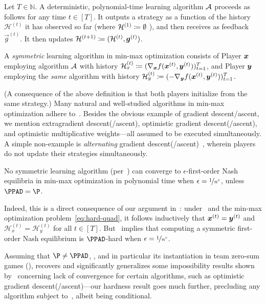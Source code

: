 \begin{definition}
    \label{def:sym-dynamics}
    Let $T \in \mathbb{N}$. A deterministic, polynomial-time learning algorithm $\mathcal{A}$ proceeds as follows for any time $t \in [T]$. It outputs a strategy as a function of the history $\mathcal{H}^{(t)}$ it has observed so far (where $\mathcal{H}^{(1)} \coloneqq \emptyset$ ), and then receives as feedback $\vec{g}^{(t)}$. It then updates $\mathcal{H}^{(t+1)} \coloneqq ( \mathcal{H}^{(t)}, \bm{g}^{(t)})$. 
    
    A \emph{symmetric} learning algorithm in min-max optimization consists of Player ${\bm{x}}$ employing algorithm $\mathcal{A}$ with history $\mathcal{H}_x^{(t)} \coloneqq (\nabla_{{\bm{x}}} f({\bm{x}}^{(t)}, {\bm{y}}^{(t)}) )_{t=1}^T$, and Player ${\bm{y}}$ employing the \emph{same} algorithm with history $\mathcal{H}_y^{(t)} \coloneqq (- \nabla_{{\bm{y}}} f({\bm{x}}^{(t)}, {\bm{y}}^{(t)}) )_{t=1}^T$.
\end{definition}

(A consequence of the above definition is that both players initialize from the same strategy.) Many natural and well-studied algorithms in min-max optimization adhere to~. Besides the obvious example of gradient descent/ascent, we mention extragradient descent(/ascent), optimistic gradient descent(/ascent), and optimistic multiplicative weights---all assumed to be executed simultaneously. A simple non-example is \emph{alternating} gradient descent(/ascent)~\citep{Wibisono22:Alternating,Bailey20:Finite}, wherein players do not update their strategies simultaneously.

\begin{theorem}
    \label{theorem:sym-dyn}
    No symmetric learning algorithm (per~) can converge to $\epsilon$-first-order Nash equilibria in min-max optimization in polynomial time when $\epsilon = \nicefrac{1}{n^c}$, unless $\PPAD = \P$.
\end{theorem}

Indeed, this is a direct consequence of our argument in~: under~ and the min-max optimization problem~\eqref{eq:hard-quad}, it follows inductively that ${\bm{x}}^{(t)} = {\bm{y}}^{(t)}$ and $\mathcal{H}_x^{(t)} = \mathcal{H}_y^{(t)}$ for all $t \in [T]$. But~ implies that computing a symmetric first-order Nash equilibrium is $\PPAD$-hard when $\epsilon = \nicefrac{1}{n^c}$.

Assuming that $\P \neq \PPAD$, , and in particular its instantiation in team zero-sum games (), recovers and significantly generalizes some impossibility results shown by~\citet{kalogiannis2021teamwork} concerning lack of convergence for certain algorithms, such as optimistic gradient descent(/ascent)---our hardness result goes much further, precluding any algorithm subject to~, albeit being conditional.


